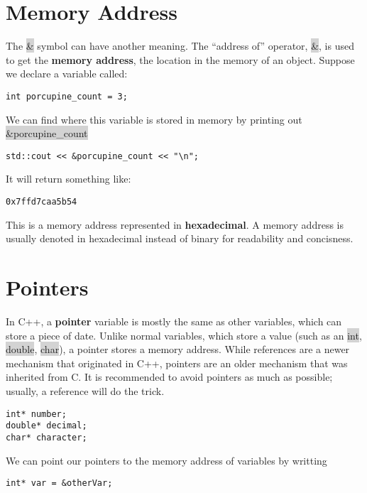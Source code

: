 \documentclass{report}
\begin{document}
\section{Memory Address}
The \colorbox{lightgray}{\&} symbol can have another meaning. The ``address of'' operator, \colorbox{lightgray}{\&}, is used to get the \textbf{memory address}, the location in the memory of an object.
Suppose we declare a variable called:
\begin{verbatim}
int porcupine_count = 3;
\end{verbatim}
We can find where this variable is stored in memory by printing out \colorbox{lightgray}{\&porcupine\_count}
\begin{verbatim}
std::cout << &porcupine_count << "\n";
\end{verbatim}
It will return something like:
\begin{verbatim}
0x7ffd7caa5b54
\end{verbatim}
This is a memory address represented in \textbf{hexadecimal}. A memory address is usually denoted in hexadecimal instead of binary for readability and concisness.
\section{Pointers}
In C++, a \textbf{pointer} variable is mostly the same as other variables, which can store a piece of date.
\bigbreak \noindent
Unlike normal variables, which store a value (such as an \colorbox{lightgray}{int}, \colorbox{lightgray}{double}, \colorbox{lightgray}{char}), a pointer stores a memory address.
\bigbreak \noindent
While references are a newer mechanism that originated in C++, pointers are an older mechanism that was inherited from C. It is recommended to avoid pointers as much as possible; usually, a reference will do the trick.
\bigbreak \noindent
\begin{verbatim}
int* number;
double* decimal;
char* character;
\end{verbatim}
We can point our pointers to the memory address of variables by writting
\begin{verbatim}
int* var = &otherVar;
\end{verbatim}
\newpage
\end{document}
